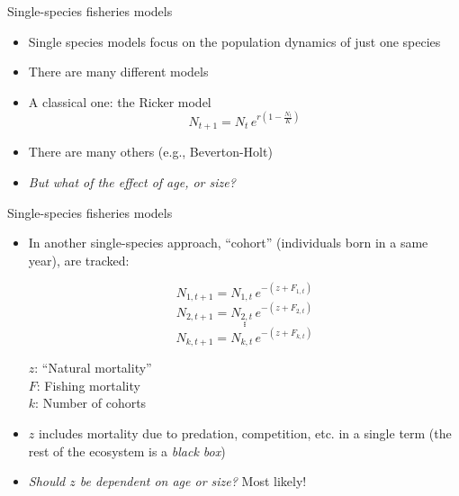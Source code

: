 \documentclass[xcolor={usenames,x11names},compress]{beamer}
\renewcommand{\(}{\begin{columns}}
\renewcommand{\)}{\end{columns}}
\newcommand{\<}[1]{\begin{column}{#1}}
\renewcommand{\>}{\end{column}}
\begin{document}
\begin{frame}{Single-species fisheries models}

  \begin{itemize}[<+->] \itemsep6pt
    \item Single species models focus on the population dynamics of
      just one species 
    \item There are many different models
    \item A classical one: the Ricker model
      \begin{equation} 
	N_{t+1} = N_t \, e^{r\left(1-\frac{N_t}{K}\right)} 
      \end{equation} 
    \item There are many others (e.g., Beverton-Holt)
    \item \textit{But what of the effect of age, or size?}
  \end{itemize}
\end{frame}



\begin{frame}{Single-species fisheries models}

  \begin{itemize}[<+->] \itemsep3pt
    \item In another single-species approach, ``cohort'' (individuals born   
      in a same year), are tracked:                                               
				{\small $$N_{1,t+1} = N_{1,t} \, e^{-(z + F_{1,t})}$$
				$$N_{2,t+1} = N_{2,t} \, e^{-(z + F_{2,t})}$$
				$$ . $$
				$$ . $$
				$$ . $$
				$$ N_{k,t+1} = N_{k,t} \, e^{-(z + F_{k,t})}$$

      $z$: ``Natural mortality'' \\
      $F$: Fishing mortality \\
      $k$: Number of cohorts }
    \item $z$ includes mortality due to predation, competition,    
      etc. in a single term (the rest of the ecosystem is a \textit{black box}) 
    \item \textit{Should $z$ be dependent on age or size?} \pause Most likely!
  \end{itemize}

\end{frame}
\end{document}
